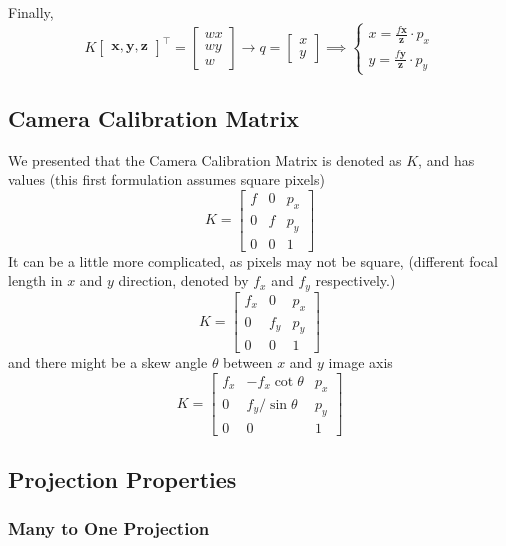 \documentclass[11pt]{article}
\newcommand{\bx}{\mathbf{x}}
\newcommand{\by}{\mathbf{y}}
\newcommand{\bz}{\mathbf{z}}
\begin{document}
Finally,
\begin{equation}
	K \begin{bmatrix}
		\bx, \by, \bz
	\end{bmatrix}^\top = \begin{bmatrix}
		wx \\ wy \\ w
	\end{bmatrix} \rightarrow q = \begin{bmatrix}
		x \\y 
	\end{bmatrix} \implies \begin{cases}
		x = \frac{f\bx}{\bz} \cdot p_{x} \\
		y = \frac{f\by}{\bz} \cdot p_{y}
	\end{cases}
\end{equation}

\subsection{Camera Calibration Matrix}
We presented that the Camera Calibration Matrix is denoted as $K$, and has values (this first formulation assumes square pixels)
\begin{equation}
	K = \begin{bmatrix}
		f & 0 & p_x \\
		0 & f & p_y \\
		0 & 0 & 1
	\end{bmatrix}
\end{equation}
It can be a little more complicated, as pixels may not be square, (different focal length in $x$ and $y$ direction, denoted by $f_x$ and $f_y$ respectively.) 
\begin{equation}
	K = \begin{bmatrix}
		f_x & 0 & p_x \\
		0 & f_y & p_y \\
		0 & 0 & 1
	\end{bmatrix}
\end{equation}
and there might be a skew angle $\theta$ between $x$ and $y$ image axis
\begin{equation}
	K = \begin{bmatrix}
		f_x & -f_x\cot \theta & p_x \\
		0 & f_y / \sin\theta & p_y \\
		0 & 0 & 1
	\end{bmatrix}
\end{equation}

\subsection{Projection Properties}
\subsubsection{Many to One Projection}
\end{document}
